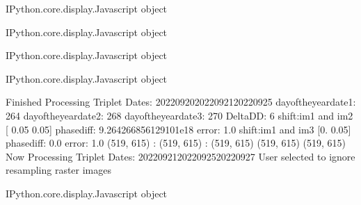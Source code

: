 \documentclass[letterpaper,10pt]{sphinxmanual}
\begin{document}
\begin{sphinxVerbatim}[commandchars=\\\{\}]
\PYGZlt{}IPython.core.display.Javascript object\PYGZgt{}
\end{sphinxVerbatim}



\begin{sphinxVerbatim}[commandchars=\\\{\}]
\PYGZlt{}IPython.core.display.Javascript object\PYGZgt{}
\end{sphinxVerbatim}



\begin{sphinxVerbatim}[commandchars=\\\{\}]
\PYGZlt{}IPython.core.display.Javascript object\PYGZgt{}
\end{sphinxVerbatim}



\begin{sphinxVerbatim}[commandchars=\\\{\}]
\PYGZlt{}IPython.core.display.Javascript object\PYGZgt{}
\end{sphinxVerbatim}



\begin{sphinxVerbatim}[commandchars=\\\{\}]
Finished Processing Triplet Dates:  20220920\PYGZhy{}20220921\PYGZhy{}20220925
day\PYGZus{}of\PYGZus{}the\PYGZus{}year\PYGZus{}date1:  264
\PYGZhy{}\PYGZhy{}\PYGZhy{}\PYGZhy{}\PYGZhy{}\PYGZhy{}\PYGZhy{}\PYGZhy{}\PYGZhy{}\PYGZhy{}\PYGZhy{}\PYGZhy{}\PYGZhy{}\PYGZhy{}\PYGZhy{}\PYGZhy{}\PYGZhy{}\PYGZhy{}\PYGZhy{}\PYGZhy{}\PYGZhy{}
day\PYGZus{}of\PYGZus{}the\PYGZus{}year\PYGZus{}date2:  268
\PYGZhy{}\PYGZhy{}\PYGZhy{}\PYGZhy{}\PYGZhy{}\PYGZhy{}\PYGZhy{}\PYGZhy{}\PYGZhy{}\PYGZhy{}\PYGZhy{}\PYGZhy{}\PYGZhy{}\PYGZhy{}\PYGZhy{}\PYGZhy{}\PYGZhy{}\PYGZhy{}\PYGZhy{}\PYGZhy{}\PYGZhy{}
day\PYGZus{}of\PYGZus{}the\PYGZus{}year\PYGZus{}date3:  270
\PYGZhy{}\PYGZhy{}\PYGZhy{}\PYGZhy{}\PYGZhy{}\PYGZhy{}\PYGZhy{}\PYGZhy{}\PYGZhy{}\PYGZhy{}\PYGZhy{}\PYGZhy{}\PYGZhy{}\PYGZhy{}\PYGZhy{}\PYGZhy{}\PYGZhy{}\PYGZhy{}\PYGZhy{}\PYGZhy{}\PYGZhy{}
Delta\PYGZus{}DD: 6
shift:im1 and im2 [ 0.05 \PYGZhy{}0.05] phasediff: 9.264266856129101e\PYGZhy{}18 error: 1.0
shift:im1 and im3 [0.   0.05] phasediff: \PYGZhy{}0.0 error: 1.0
(519, 615) :  (519, 615) :  (519, 615)
(519, 615)
(519, 615)
Now Processing Triplet Dates:  20220921\PYGZhy{}20220925\PYGZhy{}20220927
 User selected to ignore resampling raster images 



\PYGZlt{}IPython.core.display.Javascript object\PYGZgt{}
\end{sphinxVerbatim}
\end{document}
